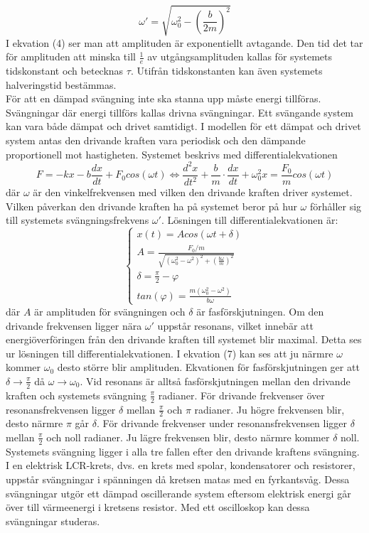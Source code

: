 \documentclass[a4paper,10pt]{article}
\begin{document}
\begin{equation}
	\omega' = \sqrt{\omega_0^2-(\frac{b}{2m})^2}
\end{equation}
I ekvation (4) ser man att amplituden är exponentiellt avtagande. Den tid det tar för amplituden att minska till $\frac{1}{e}$ av utgångsamplituden kallas för systemets tidskonstant och betecknas $\tau$. Utifrån tidskonstanten kan även systemets halveringstid bestämmas.
\\
\indent För att en dämpad svängning inte ska stanna upp måste energi tillföras. Svängningar där energi tillförs kallas drivna svängningar. Ett svängande system kan vara både dämpat och drivet samtidigt. I modellen för ett dämpat och drivet system antas den drivande kraften vara periodisk och den dämpande proportionell mot hastigheten. Systemet beskrivs med differentialekvationen
\begin{equation}
F = -kx - b\frac{dx}{dt} + F_0cos(\omega t) \Longleftrightarrow\frac{d^2x}{dt^2} + \frac{b}{m}\cdot\frac{dx}{dt} + \omega_0^2x = \frac{F_0}{m} cos(\omega t)
\end{equation}
där $\omega$ är den vinkelfrekvensen med vilken den drivande kraften driver systemet.
Vilken påverkan den drivande kraften ha på systemet beror på hur $\omega$ förhåller sig  till systemets svängningsfrekvens $\omega'$. Lösningen till differentialekvationen är:
\begin{equation}
\begin{cases}
	x(t) = Acos(\omega t + \delta) \\
	A = \frac{F_0/m}{\sqrt{(\omega_0^2 - \omega^2)^2 + (\frac{b\omega}{m})^2}} \\
	\delta = \frac{\pi}{2} - \varphi \\
	tan(\varphi) = \frac{m(\omega_0^2 - \omega^2)}{b\omega}
\end{cases}
\end{equation}
där $A$ är amplituden för svängningen och $\delta$ är fasförskjutningen. Om den drivande frekvensen ligger nära $\omega'$ uppstår resonans, vilket innebär att energiöverföringen från den drivande kraften till systemet blir maximal. Detta ses ur lösningen till differentialekvationen. I ekvation (7) kan ses att ju närmre $\omega$ kommer $\omega_0$ desto större blir amplituden. Ekvationen för fasförskjutningen ger att $\delta \rightarrow \frac{\pi}{2}$ då $\omega \rightarrow \omega_0$. Vid resonans är alltså fasförskjutningen mellan den drivande kraften och systemets svängning $\frac{\pi}{2}$ radianer. För drivande frekvenser över resonansfrekvensen ligger $\delta$ mellan $\frac{\pi}{2}$ och $\pi$ radianer. Ju högre frekvensen blir, desto närmre $\pi$ går $\delta$. För drivande frekvenser under resonansfrekvensen ligger $\delta$ mellan $\frac{\pi}{2}$ och noll radianer. Ju lägre frekvensen blir, desto närmre kommer $\delta$ noll. Systemets svängning ligger i alla tre fallen efter den drivande kraftens svängning.\\
\indent I en elektrisk LCR-krets, dvs. en krets med spolar, kondensatorer och resistorer, uppstår svängningar i spänningen då kretsen matas med en fyrkantsvåg. Dessa svängningar utgör ett dämpad oscillerande system eftersom elektrisk energi går över till värmeenergi i kretsens resistor. Med ett oscilloskop kan dessa svängningar studeras.
\end{document}
